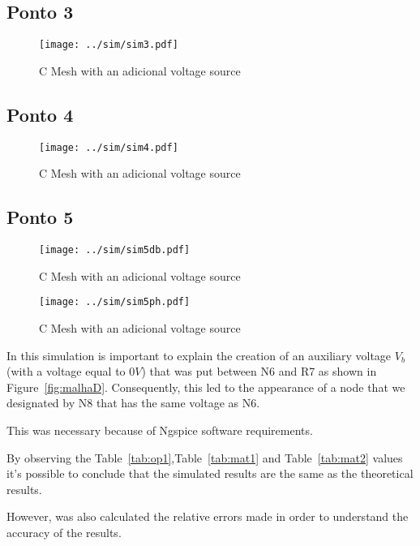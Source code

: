 \subsection{Ponto 3}

\begin{figure}[h] \centering
\texttt{[image: ../sim/sim3.pdf]}
\caption{C Mesh with an adicional voltage source} %
\label{fig:sim3}
\end{figure}

\subsection{Ponto 4}

\begin{figure}[h] \centering
\texttt{[image: ../sim/sim4.pdf]}
\caption{C Mesh with an adicional voltage source} %
\label{fig:sim4}
\end{figure}

\subsection{Ponto 5}

\begin{figure}[h] \centering
\texttt{[image: ../sim/sim5db.pdf]}
\caption{C Mesh with an adicional voltage source} %
\label{fig:sim5db}
\end{figure}

\begin{figure}[h] \centering
\texttt{[image: ../sim/sim5ph.pdf]}
\caption{C Mesh with an adicional voltage source} %
\label{fig:sim5ph}
\end{figure}

In this simulation is important to explain the creation of an auxiliary voltage $V_b$ (with a voltage equal to $0V$) that was put between N6 and R7 as shown in Figure~\ref{fig:malhaD}. Consequently, this led to the appearance of a node that we designated by N8 that has the same voltage as N6.

This was necessary because of Ngspice software requirements.

By observing the Table~\ref{tab:op1},Table~\ref{tab:mat1} and Table~\ref{tab:mat2} values it's possible to conclude that the simulated results are the same as the theoretical results.%


However, was also calculated the relative errors made in order to understand the accuracy of the results. 

